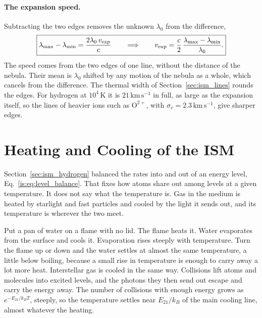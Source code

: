 \paragraph{The expansion speed.} Subtracting the two edges removes the unknown $\lambda_0$ from the difference,
\begin{equation}
	\boxed{\lambda_{\max}-\lambda_{\min} = \frac{2\lambda_0\,v_{\rm exp}}{c} \qquad\Longrightarrow\qquad v_{\rm exp} = \frac{c}{2}\,\frac{\lambda_{\max}-\lambda_{\min}}{\lambda_0}.}
	\label{eq:pn_expansion_velocity}
\end{equation}
The speed comes from the two edges of one line, without the distance of the nebula. Their mean is $\lambda_0$ shifted by any motion of the nebula as a whole, which cancels from the difference. The thermal width of Section~\ref{sec:ism_lines} rounds the edges. For hydrogen at $10^4\,\mathrm K$ it is $21\,\mathrm{km\,s^{-1}}$ in full, as large as the expansion itself, so the lines of heavier ions such as $\mathrm{O^{2+}}$, with $\sigma_v=2.3\,\mathrm{km\,s^{-1}}$, give sharper edges.

\section{Heating and Cooling of the ISM}
\label{sec:ism_heating_cooling}

Section~\ref{sec:ism_hydrogen} balanced the rates into and out of an energy level, Eq.~\eqref{is:eq:level_balance}. That fixes how atoms share out among levels at a given temperature. It does not say what the temperature is. Gas in the medium is heated by starlight and fast particles and cooled by the light it sends out, and its temperature is wherever the two meet.

Put a pan of water on a flame with no lid. The flame heats it. Water evaporates from the surface and cools it. Evaporation rises steeply with temperature. Turn the flame up or down and the water settles at almost the same temperature, a little below boiling, because a small rise in temperature is enough to carry away a lot more heat. Interstellar gas is cooled in the same way. Collisions lift atoms and molecules into excited levels, and the photons they then send out escape and carry the energy away. The number of collisions with enough energy grows as $e^{-E_{21}/k_BT}$, steeply, so the temperature settles near $E_{21}/k_B$ of the main cooling line, almost whatever the heating.

